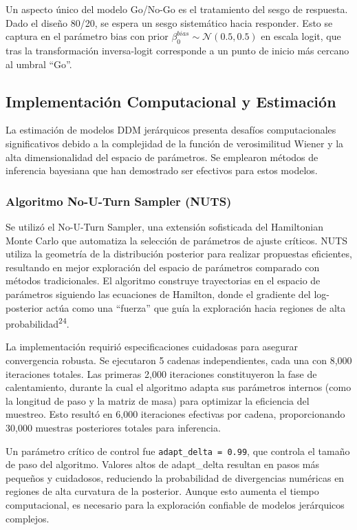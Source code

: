 \documentclass[
  spanish,
  10pt,
]{article}
\begin{document}
Un aspecto único del modelo Go/No-Go es el tratamiento del sesgo de
respuesta. Dado el diseño 80/20, se espera un sesgo sistemático hacia
responder. Esto se captura en el parámetro bias con prior
\(\beta_0^{bias} \sim \mathcal{N}(0.5, 0.5)\) en escala logit, que tras
la transformación inversa-logit corresponde a un punto de inicio más
cercano al umbral ``Go''.

\subsection{Implementación Computacional y
Estimación}\label{implementaciuxf3n-computacional-y-estimaciuxf3n}

La estimación de modelos DDM jerárquicos presenta desafíos
computacionales significativos debido a la complejidad de la función de
verosimilitud Wiener y la alta dimensionalidad del espacio de
parámetros. Se emplearon métodos de inferencia bayesiana que han
demostrado ser efectivos para estos modelos.

\subsubsection{Algoritmo No-U-Turn Sampler
(NUTS)}\label{algoritmo-no-u-turn-sampler-nuts}

Se utilizó el No-U-Turn Sampler, una extensión sofisticada del
Hamiltonian Monte Carlo que automatiza la selección de parámetros de
ajuste críticos. NUTS utiliza la geometría de la distribución posterior
para realizar propuestas eficientes, resultando en mejor exploración del
espacio de parámetros comparado con métodos tradicionales. El algoritmo
construye trayectorias en el espacio de parámetros siguiendo las
ecuaciones de Hamilton, donde el gradiente del log-posterior actúa como
una ``fuerza'' que guía la exploración hacia regiones de alta
probabilidad\textsuperscript{24}.

La implementación requirió especificaciones cuidadosas para asegurar
convergencia robusta. Se ejecutaron 5 cadenas independientes, cada una
con 8,000 iteraciones totales. Las primeras 2,000 iteraciones
constituyeron la fase de calentamiento, durante la cual el algoritmo
adapta sus parámetros internos (como la longitud de paso y la matriz de
masa) para optimizar la eficiencia del muestreo. Esto resultó en 6,000
iteraciones efectivas por cadena, proporcionando 30,000 muestras
posteriores totales para inferencia.

Un parámetro crítico de control fue \texttt{adapt\_delta\ =\ 0.99}, que
controla el tamaño de paso del algoritmo. Valores altos de adapt\_delta
resultan en pasos más pequeños y cuidadosos, reduciendo la probabilidad
de divergencias numéricas en regiones de alta curvatura de la posterior.
Aunque esto aumenta el tiempo computacional, es necesario para la
exploración confiable de modelos jerárquicos complejos.
\end{document}
